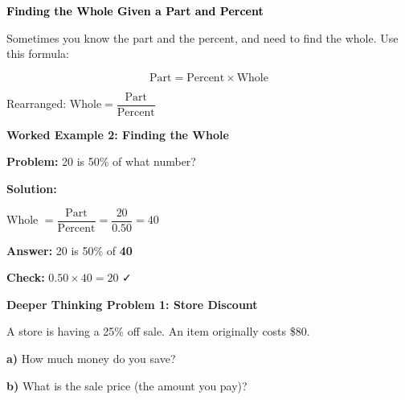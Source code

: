 \documentclass[12pt, letterpaper, fleqn]{article}
\begin{document}
\begin{tcolorbox}[colback=customteal!20]
\large\textcolor{black}{\textbf{Finding the Whole Given a Part and Percent}}
\end{tcolorbox}

\noindent
Sometimes you know the part and the percent, and need to find the whole. Use this formula:

$$\text{Part} = \text{Percent} \times \text{Whole}$$

\noindent
Rearranged: $\text{Whole} = \dfrac{\text{Part}}{\text{Percent}}$

\vspace{3mm}

\begin{tcolorbox}[colback=white, colframe=black!25, boxrule=0.6pt, arc=4mm, left=6mm, right=6mm, top=5mm, bottom=5mm]

\textbf{Worked Example 2: Finding the Whole}

\medskip

\textbf{Problem:} 20 is 50\% of what number?

\medskip

\noindent
\textbf{Solution:}

\medskip

\noindent
Whole $= \dfrac{\text{Part}}{\text{Percent}} = \dfrac{20}{0.50} = 40$

\medskip

\noindent
\textbf{Answer:} 20 is 50\% of \textbf{40}

\medskip

\noindent
\textbf{Check:} $0.50 \times 40 = 20$ ✓

\end{tcolorbox}

\vspace{4mm}

\begin{tcolorbox}[colback=yellow!15, colframe=orange, boxrule=1.5pt, arc=4mm, left=6mm, right=6mm, top=5mm, bottom=5mm]

\textbf{Deeper Thinking Problem 1: Store Discount}

\medskip

\noindent
A store is having a 25\% off sale. An item originally costs \$80.

\noindent
\textbf{a)} How much money do you save?

\vspace{1.8cm}

\noindent
\textbf{b)} What is the sale price (the amount you pay)?

\vspace{1.8cm}

\end{tcolorbox}
\end{document}
